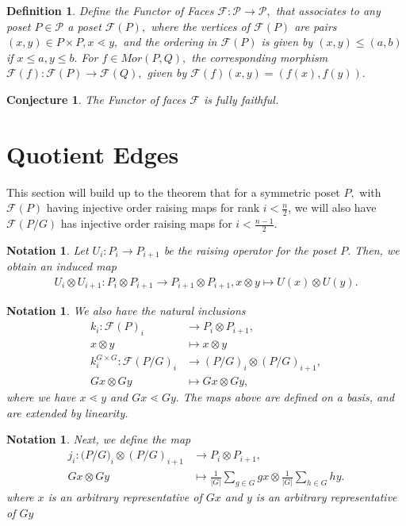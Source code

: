 \documentclass{amsart}
\newtheorem{conj}{Conjecture}
\newtheorem{defn}[subsubsection]{Definition}
\newtheorem{note}[subsubsection]{Notation}
\begin{document}
\begin{defn}
Define the {\it Functor of Faces} $\mathcal F:\mathcal P \rightarrow \mathcal P,$ that associates to any poset $P \in \mathcal P$ a poset $\mathcal F(P),$ where the vertices of $\mathcal F(P)$ are pairs $(x,y)\in P \times P,x \lessdot y,$ and the ordering in $\mathcal F(P)$ is given by $(x,y)\leq (a,b)$ if $x \leq a,y\leq b.$ For $f \in Mor(P,Q),$ the corresponding morphism $\mathcal F(f):\mathcal F(P) \rightarrow \mathcal F(Q),$ given by $\mathcal F(f)(x,y) = (f(x),f(y)).$
\end{defn}

\begin{conj}
The Functor of faces $\mathcal F$ is fully faithful.
\end{conj}

\section{Quotient Edges}

This section will build up to the theorem that for a symmetric poset $P,$ with $\mathcal F(P)$ having injective order raising maps for rank $i < \frac{n}{2}$, we will also have $\mathcal F(P/G)$ has injective order raising maps for $i < \frac{n-1}{2}.$ 

\begin{note}
Let $U_i:P_i \rightarrow P_{i+1}$ be the raising operator for the poset $P.$ Then, we obtain an induced map
\begin{align*}
	U_i \otimes U_{i+1}:P_i\otimes P_{i+1} \rightarrow P_{i+1} \otimes P_{i+1},x \otimes y \mapsto U(x) \otimes U(y).
\end{align*}
\end{note}

\begin{note}
We also have the natural inclusions
\begin{align*}
	k_i:\mathcal F(P)_i &\rightarrow P_i \otimes P_{i+1},\\
	x\otimes y &\mapsto x\otimes y\\
	k_i^{G\times G}:\mathcal F(P/G)_i &\rightarrow (P/G)_i \otimes (P/G)_{i+1},\\
	Gx\otimes Gy &\mapsto Gx\otimes Gy,
\end{align*}
where we have $x \lessdot y$ and $Gx \lessdot Gy.$ The maps above are defined on a basis, and are extended by linearity.
\end{note}

\begin{note}
Next, we define the map
\begin{align*}
	j_i:\mathcal (P/G)_i \otimes (P/G)_{i+1} & \rightarrow P_i \otimes P_{i+1},\\
	Gx\otimes Gy &\mapsto \frac{1}{|G|}\sum_{g \in G}^{} gx\otimes \frac{1}{|G|}\sum_{h\in G}^{}hy.
\end{align*}
where $x$ is an arbitrary representative of $Gx$ and $y$ is an arbitrary representative of $Gy$
\end{note}
\end{document}
